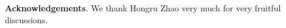 \documentclass[conference,letterpaper]{IEEEtran}
\numberwithin{equation}{section}
\begin{document}
\noindent\textbf{Acknowledgements}. We thank Hongru Zhao very much for very fruitful   discussions.




%
%
%
%
%
%
%
%
%
%
%
\end{document}
